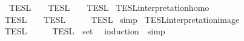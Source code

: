 \begin{isabellebody}
{\isacharbar}\ {\isacartoucheopen}{\isasymlbrakk}{\isasymlbrakk}\ {\isasymphi}\ {\isacharhash}\ {\isasymPhi}\ {\isasymrbrakk}{\isasymrbrakk}\isactrlsub T\isactrlsub E\isactrlsub S\isactrlsub L\ {\isacharequal}\ {\isasymlbrakk}\ {\isasymphi}\ {\isasymrbrakk}\isactrlsub T\isactrlsub E\isactrlsub S\isactrlsub L\ {\isasyminter}\ {\isasymlbrakk}{\isasymlbrakk}\ {\isasymPhi}\ {\isasymrbrakk}{\isasymrbrakk}\isactrlsub T\isactrlsub E\isactrlsub S\isactrlsub L{\isacartoucheclose}\isanewline
\isanewline
{}\isamarkupfalse%
\ TESL{\isacharunderscore}interpretation{\isacharunderscore}homo{\isacharcolon}\isanewline
\ \ {\isacartoucheopen}{\isasymlbrakk}\ {\isasymphi}\ {\isasymrbrakk}\isactrlsub T\isactrlsub E\isactrlsub S\isactrlsub L\ {\isasyminter}\ {\isasymlbrakk}{\isasymlbrakk}\ {\isasymPhi}\ {\isasymrbrakk}{\isasymrbrakk}\isactrlsub T\isactrlsub E\isactrlsub S\isactrlsub L\ {\isacharequal}\ {\isasymlbrakk}{\isasymlbrakk}\ {\isasymphi}\ {\isacharhash}\ {\isasymPhi}\ {\isasymrbrakk}{\isasymrbrakk}\isactrlsub T\isactrlsub E\isactrlsub S\isactrlsub L{\isacartoucheclose}\isanewline
%
\isadelimproof
%
\endisadelimproof
%
\isatagproof
{}\isamarkupfalse%
\ simp%
\endisatagproof
{\isafoldproof}%
%
\isadelimproof
%
\endisadelimproof
%
\isadelimdocument
%
\endisadelimdocument
%
\isatagdocument
%
\isamarkuptrue%
%
\endisatagdocument
{\isafolddocument}%
%
\isadelimdocument
%
\endisadelimdocument
{}\isamarkupfalse%
\ TESL{\isacharunderscore}interpretation{\isacharunderscore}image{\isacharcolon}\isanewline
\ \ {\isacartoucheopen}{\isasymlbrakk}{\isasymlbrakk}\ {\isasymPhi}\ {\isasymrbrakk}{\isasymrbrakk}\isactrlsub T\isactrlsub E\isactrlsub S\isactrlsub L\ {\isacharequal}\ {\isasymInter}\ {\isacharparenleft}{\isacharparenleft}{\isasymlambda}{\isasymphi}{\isachardot}\ {\isasymlbrakk}\ {\isasymphi}\ {\isasymrbrakk}\isactrlsub T\isactrlsub E\isactrlsub S\isactrlsub L{\isacharparenright}\ {\isacharbackquote}\ set\ {\isasymPhi}{\isacharparenright}{\isacartoucheclose}\isanewline
%
\isadelimproof
%
\endisadelimproof
%
\isatagproof
{}\isamarkupfalse%
\ {\isacharparenleft}induction\ {\isasymPhi}{\isacharcomma}\ simp{\isacharplus}{\isacharparenright}%
\endisatagproof
{\isafoldproof}%
%
\isadelimproof
%
\endisadelimproof
%
\isadelimdocument
%
\endisadelimdocument
%
\isatagdocument
%
\isamarkuptrue%
%
\endisatagdocument
{\isafolddocument}%
%
\isadelimdocument
%
\endisadelimdocument
%
\begin{isamarkuptext}%

\end{isamarkuptext}
\end{isabellebody}

